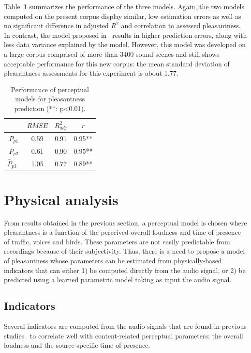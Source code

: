 \documentclass[11pt,a4paper]{article}
\begin{document}
Table~\ref{tab:percm} summarizes the performance of the three models. Again, the two models computed on the present corpus display similar, low estimation errors as well as no significant difference in adjusted $R^2$ and correlation to assessed pleasantness. In contrast, the model proposed in~\cite{ricciardi2014} results in higher prediction errors, along with less data variance explained by the model. However, this model was developed on a large corpus comprised of more than 3400 sound scenes and still shows acceptable performance for this new corpus: the mean standard deviation of pleasantness assessments for this experiment is about 1.77.

\begin{table}[t]
\centering
\caption{Performance of perceptual models for pleasantness prediction (**: p<0.01).}
\label{tab:percm}
\begin{tabular}{ c | c | c | c }
\hline
	 & $RMSE$ & $R^2_{adj}$ & $r$ \\ \hline
	$\hat P_{p1}$ & 0.59 & 0.91 & 0.95** \\
	$\hat P_{p2}$ & 0.61 & 0.90 & 0.95** \\
	$\hat P_{p3}$~\cite{ricciardi2014} & 1.05 & 0.77 & 0.89** \\ \hline
\end{tabular}
\end{table}

\section{Physical analysis}

From results obtained in the previous section, a perceptual model is chosen where pleasantness is a function of the perceived overall loudness and time of presence of traffic, voices and birds. These parameters are not easily predictable from recordings because of their subjectivity. Thus, there is a need to propose a model of pleasantness whose parameters can be estimated from physically-based indicators that can either 1) be computed directly from the audio signal, or 2) be predicted using a learned parametric model taking as input the audio signal.

\subsection{Indicators}

Several indicators are computed from the audio signals that are found in previous studies~\cite{aumond2017, gontier2018} to correlate well with content-related perceptual parameters: the overall loudness and the source-specific time of presence.\\
\end{document}
